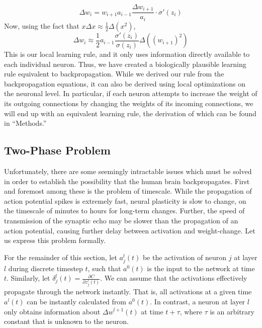 \documentclass[12pt]{article}
\newcommand{\partialderiv}[2]{\frac{\partial #1}{\partial #2}}
\begin{document}
\begin{equation}
	\Delta w_i = w_{i+1}a_{i-1}\frac{\Delta w_{i+1}}{a_i}\cdot\sigma'(z_i)
\end{equation}
Now, using the fact that $x\Delta x\approx\frac{1}{2}\Delta (x^2)$,
\begin{equation}
	\Delta w_i\approx \frac{1}{2}a_{i-1}\frac{\sigma'\left(z_i\right)}{\sigma\left(z_i\right)}\Delta \left(\left(w_{i+1}\right)^2\right)\label{simp19}
\end{equation}
This is our local learning rule, and it only uses information directly available to each individual neuron. Thus, we have created a biologically plausible learning rule equivalent to backpropagation. While we derived our rule from the backpropagation equations, it can also be derived using local optimizations on the neuronal level. In particular, if each neuron attempts to increase the weight of its outgoing connections by changing the weights of its incoming connections, we will end up with an equivalent learning rule, the derivation of which can be found in ``Methods.''

\subsection{Two-Phase Problem}
Unfortunately, there are some seemingly intractable issues which must be solved in order to establish the possibility that the human brain backpropagates. First and foremost among these is the problem of timescale. While the propagation of action potential spikes is extremely fast, neural plasticity is slow to change, on the timescale of minutes to hours for long-term changes. \cite{Wei2021} Further, the speed of transmission of the synaptic echo may be slower than the propagation of an action potential, causing further delay between activation and weight-change. Let us express this problem formally.

For the remainder of this section, let $a_j^l(t)$ be the activation of neuron $j$ at layer $l$ during discrete timestep $t$, such that $a^0(t)$ is the input to the network at time $t$. Similarly, let $\delta^l_j(t) = \partialderiv{C}{z_j^l(t)}$. We can assume that the activations effectively propagate through the network instantly. That is, all activations at a given time $a^l(t)$ can be instantly calculated from $a^0(t)$. In contrast, a neuron at layer $l$ only obtains information about $\Delta w^{l+1}(t)$ at time $t + \tau$, where $\tau$ is an arbitrary constant that is unknown to the neuron.
\end{document}
